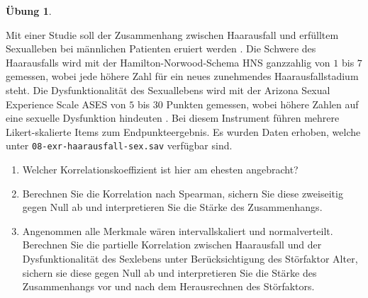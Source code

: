 \documentclass[
]{book}
\providecommand{\tightlist}{%
  \setlength{\itemsep}{0pt}\setlength{\parskip}{0pt}}
\theoremstyle{definition}
\theoremstyle{definition}
\theoremstyle{definition}
\newtheorem{exercise}{Übung}[chapter]
\theoremstyle{definition}
\theoremstyle{remark}
\begin{document}
\begin{exercise}
\protect\hypertarget{exr:hairloss-sex}{}\label{exr:hairloss-sex}\leavevmode

Mit einer Studie soll der Zusammenhang zwischen Haarausfall und erfülltem Sexualleben bei männlichen Patienten eruiert werden \citep{tas2018}. Die Schwere des Haarausfalls wird mit der Hamilton-Norwood-Schema HNS ganzzahlig von \(1\) bis \(7\) gemessen, wobei jede höhere Zahl für ein neues zunehmendes Haarausfallstadium steht\citep{hamilton1951}. Die Dysfunktionalität des Sexuallebens wird mit der Arizona Sexual Experience Scale ASES von \(5\) bis \(30\) Punkten gemessen, wobei höhere Zahlen auf eine sexuelle Dysfunktion hindeuten \citep{mcgahuey2016}. Bei diesem Instrument führen mehrere Likert-skalierte Items zum Endpunkteergebnis. Es wurden Daten erhoben, welche unter \texttt{08-exr-haarausfall-sex.sav} verfügbar sind.

\begin{enumerate}
\def\labelenumi{\alph{enumi})}
\tightlist
\item
  Welcher Korrelationskoeffizient ist hier am ehesten angebracht?
\item
  Berechnen Sie die Korrelation nach Spearman, sichern Sie diese zweiseitig gegen Null ab und interpretieren Sie die Stärke des Zusammenhangs.
\item
  Angenommen alle Merkmale wären intervallskaliert und normalverteilt. Berechnen Sie die partielle Korrelation zwischen Haarausfall und der Dysfunktionalität des Sexlebens unter Berücksichtigung des Störfaktor Alter, sichern sie diese gegen Null ab und interpretieren Sie die Stärke des Zusammenhangs vor und nach dem Herausrechnen des Störfaktors.
\end{enumerate}

\end{exercise}
\end{document}
